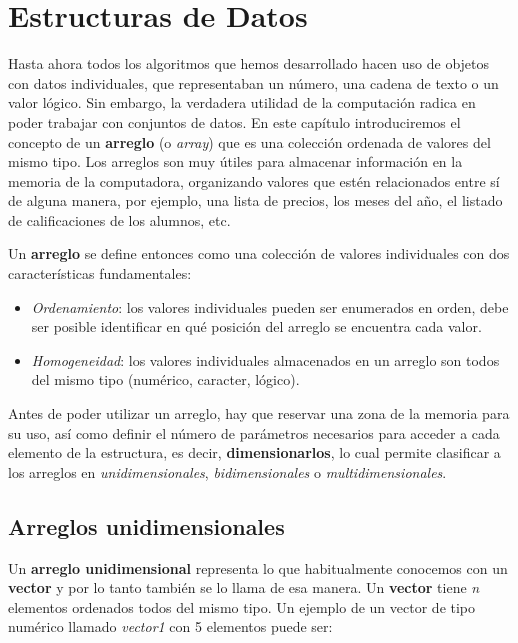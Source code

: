 \documentclass[
]{book}
\providecommand{\tightlist}{%
  \setlength{\itemsep}{0pt}\setlength{\parskip}{0pt}}
\begin{document}
\hypertarget{estructuras-de-datos}{%
\chapter{Estructuras de Datos}\label{estructuras-de-datos}}

Hasta ahora todos los algoritmos que hemos desarrollado hacen uso de objetos con datos individuales, que representaban un número, una cadena de texto o un valor lógico. Sin embargo, la verdadera utilidad de la computación radica en poder trabajar con conjuntos de datos. En este capítulo introduciremos el concepto de un \textbf{arreglo} (o \emph{array}) que es una colección ordenada de valores del mismo tipo. Los arreglos son muy útiles para almacenar información en la memoria de la computadora, organizando valores que estén relacionados entre sí de alguna manera, por ejemplo, una lista de precios, los meses del año, el listado de calificaciones de los alumnos, etc.

Un \textbf{arreglo} se define entonces como una colección de valores individuales con dos características fundamentales:

\begin{itemize}
\tightlist
\item
  \emph{Ordenamiento}: los valores individuales pueden ser enumerados en orden, debe ser posible identificar en qué posición del arreglo se encuentra cada valor.
\item
  \emph{Homogeneidad}: los valores individuales almacenados en un arreglo son todos del mismo tipo (numérico, caracter, lógico).
\end{itemize}

Antes de poder utilizar un arreglo, hay que reservar una zona de la memoria para su uso, así como definir el número de parámetros necesarios para acceder a cada elemento de la estructura, es decir, \textbf{dimensionarlos}, lo cual permite clasificar a los arreglos en \emph{unidimensionales}, \emph{bidimensionales} o \emph{multidimensionales}.

\hypertarget{arreglos-unidimensionales}{%
\section{Arreglos unidimensionales}\label{arreglos-unidimensionales}}

Un \textbf{arreglo unidimensional} representa lo que habitualmente conocemos con un \textbf{vector} y por lo tanto también se lo llama de esa manera. Un \textbf{vector} tiene \emph{n} elementos ordenados todos del mismo tipo. Un ejemplo de un vector de tipo numérico llamado \emph{vector1} con 5 elementos puede ser:
\end{document}
